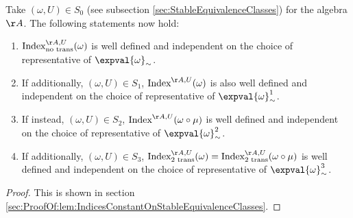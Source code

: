 \begin{theorem}\label{lem:IndicesConstantOnStableEquivalenceClasses}
	Take $(\omega,U)\in S_0$ (see subsection \ref{sec:StableEquivalenceClasses}) for the algebra $\AA$. The following statements now hold:
	\begin{enumerate}
		\item $\textrm{Index}^{\AA,U}_{\text{no trans}}(\omega)$ is well defined and independent on the choice of representative of $\expval{\omega}_\sim$.
		\item If additionally, $(\omega,U)\in S_1$, $\textrm{Index}^{\AA,U}(\omega)$ is also well defined and independent on the choice of representative of $\expval{\omega}_\sim^1$.
		\item If instead, $(\omega,U)\in S_2$, $\textrm{Index}^{\AA,U}(\omega\circ\mu)$ is well defined and independent on the choice of representative of $\expval{\omega}_\sim^2$.
		\item If additionally, $(\omega,U)\in S_3$, $\textrm{Index}^{\AA,U}_{\textrm{2 trans}}(\omega)=\textrm{Index}^{\AA,U}_{\textrm{2 trans}}(\omega\circ\mu)$ is well defined and independent on the choice of representative of $\expval{\omega}_\sim^3$.
	\end{enumerate}
\end{theorem}
\begin{proof}
	This is shown in section \ref{sec:ProofOf:lem:IndicesConstantOnStableEquivalenceClasses}.
\end{proof}
